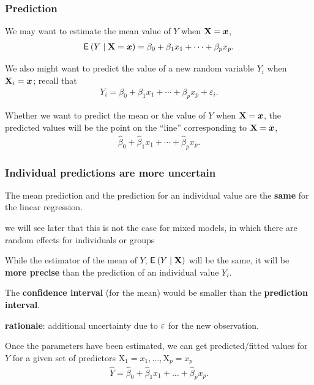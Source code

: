 \documentclass{beamer}
\begin{document}
\begin{frame}
\frametitle{Prediction}
\bi
\item We may want to estimate the \alert{mean value of $Y$} when $\mathbf{X}=\boldsymbol {x}$,
\begin{align*}
{\mathsf E}_{}\left(Y\mid \mathbf{X}=\boldsymbol {x}\right)=\beta_0+\beta_1x_1 + \cdots + \beta_px_p.\end{align*}
\item We also might want to \alert{predict the value} of a new random variable $Y_i$ when $\mathbf{X}_i=\boldsymbol {x}$; recall that 
\begin{align*}
Y_i=\beta_0+\beta_1x_1 + \cdots + \beta_px_p +\varepsilon_i.
\end{align*}
\item Whether we want to predict the \alert{mean} or the \alert{value} of $Y$ when $\mathbf{X}=\boldsymbol {x}$, the predicted values will be the point on the ``line'' corresponding to $\mathbf{X}=\boldsymbol {x}$,
\begin{align*}
\hat{\beta}_0+\hat{\beta}_1x_{1} + \cdots + \hat{\beta}_px_{p}.
\end{align*}

\ei

\end{frame}
\begin{frame}
\frametitle{Individual predictions are more uncertain}
\bi 
\item The mean prediction and the prediction for an individual value are the \textbf{same} for the linear regression.
\bi \item we will see later that this is not the case for mixed models, in which there are random effects for individuals or groups
\ei
\item While the estimator of the mean of $Y$, ${\mathsf E}_{}\left(Y \mid \mathbf{X}\right)$ will be the same, it will be \alert{\textbf{more precise}} than the prediction of an individual value $Y_i$.
\item The \textbf{confidence interval} (for the mean) would be smaller than the \textbf{prediction interval}.
\bi \item \textbf{rationale}: additional uncertainty due to $\varepsilon$ for the new observation.
\ei
\item Once the parameters have been estimated, we can get predicted/fitted values for
$Y$ for a given set of predictors $\mathrm{X}_1=x_1, \ldots,\mathrm{X}_p=x_p$
\begin{align*}
\hat{Y}=\hat{\beta}_0 +\hat{\beta}_1 x_1+\ldots+\hat{\beta}_px_p.
\end{align*}
\ei
\end{frame}
\end{document}
